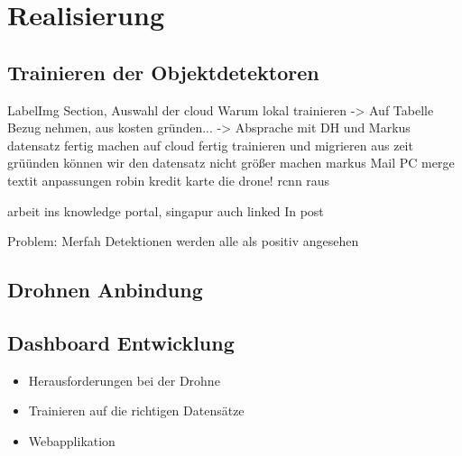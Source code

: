 \chapter{Realisierung}

\section{Trainieren der Objektdetektoren}

LabelImg Section, Auswahl der cloud
Warum lokal trainieren -> Auf Tabelle Bezug nehmen, aus kosten gründen... -> Absprache mit DH und Markus
datensatz fertig machen
auf cloud fertig trainieren und migrieren
aus zeit grüünden können wir den datensatz nicht größer machen
markus Mail
PC merge
textit anpassungen
robin kredit karte
die drone!
rcnn raus

arbeit ins knowledge portal, singapur auch
linked In post

Problem: Merfah Detektionen werden alle als positiv angesehen

\section{Drohnen Anbindung}

\section{Dashboard Entwicklung}

\begin{itemize}
	\item Herausforderungen bei der Drohne
	\item Trainieren auf die richtigen Datensätze
	\item Webapplikation
\end{itemize}